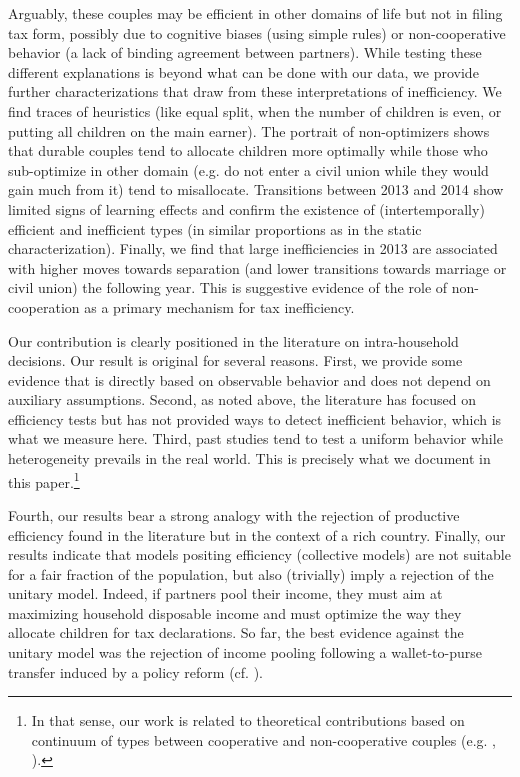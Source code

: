 Arguably, these couples may be efficient in other domains of life but not in filing tax form, possibly due to cognitive biases (using simple rules) or non-cooperative behavior (a lack of binding agreement between partners). While testing these different explanations is beyond what can be done with our data, we provide further characterizations that draw from these interpretations of inefficiency. We find traces of heuristics (like equal split, when the number of children is even, or putting all children on the main earner). The portrait of non-optimizers shows that durable couples tend to allocate children more optimally while those who sub-optimize in other domain (e.g. do not enter a civil union while they would gain much from it) tend to misallocate. Transitions between 2013 and 2014 show limited signs of learning effects and confirm the existence of (intertemporally) efficient and inefficient types (in similar proportions as in the static characterization).
Finally, we find that large inefficiencies in 2013 are associated with higher moves towards separation (and lower transitions towards marriage or civil union) the following year. This is suggestive evidence of the role of non-cooperation as a primary mechanism for tax inefficiency. 


\medskip 

Our contribution is clearly positioned in the literature on intra-household decisions. Our result is original for several reasons. First, we provide some evidence that is directly based on observable behavior and does not depend on auxiliary assumptions. Second, as noted above, the literature has focused on efficiency tests but has not provided ways to detect inefficient behavior, which is what we measure here. Third, past studies tend to test a uniform behavior while heterogeneity prevails in the real world. This is precisely what we document in this paper.\footnote{
    In that sense, our work is related to theoretical contributions based on continuum of types between cooperative and non-cooperative couples (e.g. \citet{cherchye2015noncooperative}, \citet{d2018enlarging}).
    }  




Fourth, our results bear a strong analogy with the rejection of productive efficiency found in the literature but in the context of a rich country. Finally, our results indicate that models positing efficiency (collective models) are not suitable for a fair fraction of the population, but also (trivially) imply a rejection of the unitary model. Indeed, if partners pool their income, they must aim at maximizing household disposable income and must optimize the way they allocate children for tax declarations. So far, the best evidence against the unitary model was the rejection of income pooling following a wallet-to-purse transfer induced by a policy reform (cf. \citet{lundberg1997husbands}). 

